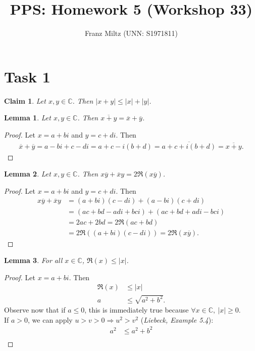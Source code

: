 \documentclass{article}
\title{PPS: Homework 5 (Workshop 33)}
\author{Franz Miltz (UNN: S1971811)}
\newcommand*\lneg[1]{\overline{#1}}
\newcommand{\C}{\mathbb{C}}
\newtheorem{claim}[section]{Claim}
\newtheorem{lemma}{Lemma}[section]
\begin{document}
\maketitle
\section*{Task 1}
\begin{claim}
  Let $x,y\in\C$. Then $|x+y|\leq |x|+|y|$.
\end{claim}
\begin{adjustwidth}{2em}{0pt}
  \begin{lemma}
    \label{l1}
    Let $x,y\in\C$. Then $\lneg{x+y}=\lneg{x}+\lneg{y}$. 
  \end{lemma}
  \begin{proof}
    Let $x=a+bi$ and $y=c+di$. Then
    \begin{align*}
      \lneg{x}+\lneg{y}=a-bi+c-di=a+c-i(b+d)=\lneg{a+c+i(b+d)}=\lneg{x+y}.
    \end{align*}
  \end{proof}
  \begin{lemma}
    \label{l2}
    Let $x,y\in\C$. Then $x\lneg{y}+\lneg{x}y=2\Re({x\lneg{y}})$.
  \end{lemma}
  \begin{proof}
    Let $x=a+bi$ and $y=c+di$. Then
    \begin{align*}
      x\lneg{y}+\lneg{x}y&=(a+bi)(c-di)+(a-bi)(c+di)\\
      &=(ac+bd-adi+bci)+(ac+bd+adi-bci)\\
      &=2ac+2bd=2\Re(ac+bd)\\
      &=2\Re((a+bi)(c-di))=2\Re(x\lneg{y}).
    \end{align*}
  \end{proof}
  \begin{lemma}
    \label{l3}
    For all $x\in\C$, $\Re(x)\leq|x|$.
  \end{lemma}
  \begin{proof}
    Let $x=a+bi$. Then
    \begin{align*}
      \Re(x)&\leq|x|\\
      a&\leq \sqrt{a^2+b^2}.
    \end{align*}
    Observe now that if $a\leq0$, this is immediately true because $\forall x\in\C,\:|x|\geq 0$.\\
    If $a>0$, we can apply $u>v>0\Rightarrow u^2>v^2$ (\emph{Liebeck, Example 5.4}):
    \begin{align*}
      a^2&\leq a^2+b^2\\

\end{align*}
\end{proof}
\end{adjustwidth}
\end{document}
